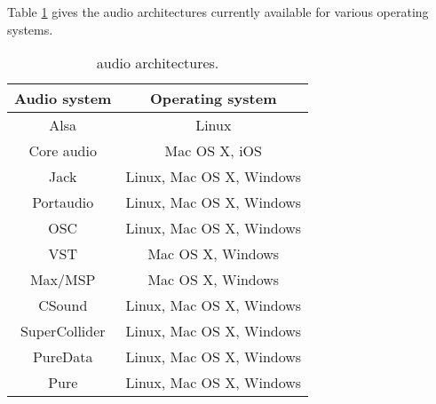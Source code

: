 Table \ref{tab:aarch} gives the audio architectures currently available for various operating systems.
\begin{table}[htp]
\begin{center}
\begin{tabular}{|c|c|}
\hline
\bf{Audio system} & \bf{Operating system} \\
\hline
Alsa  & Linux \\
Core audio 		& Mac OS X, iOS \\
Jack 				& Linux, Mac OS X, Windows \\
Portaudio 			& Linux, Mac OS X, Windows \\
OSC					& Linux, Mac OS X, Windows \\
VST					& Mac OS X, Windows \\
Max/MSP				& Mac OS X, Windows \\
CSound				& Linux, Mac OS X, Windows \\
SuperCollider		& Linux, Mac OS X, Windows \\
PureData			& Linux, Mac OS X, Windows \\
Pure 				& Linux, Mac OS X, Windows \\
\hline
\end{tabular}
\end{center}
\caption{\faust audio architectures.}
\label{tab:aarch}
\end{table}%
 

% 


